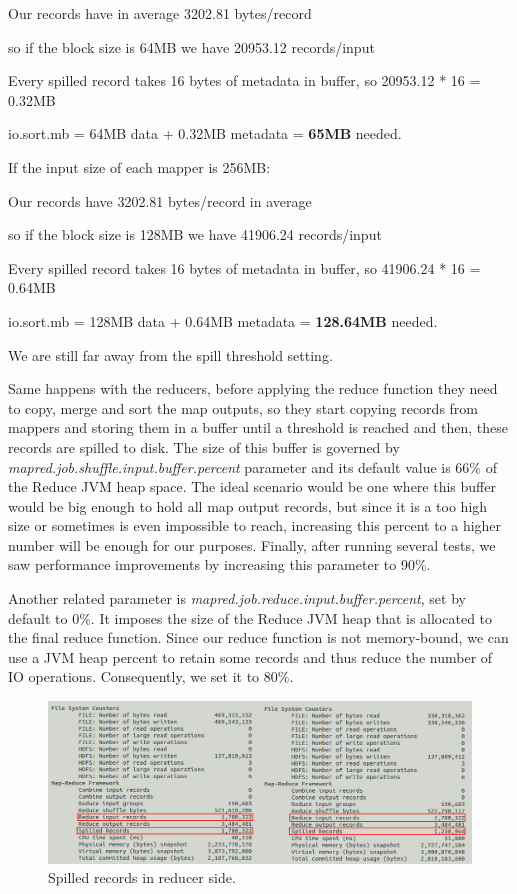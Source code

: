 \begin{itemize}
\centerline{Our records have in average 3202.81 bytes/record}
\centerline{so if the block size is 64MB we have 20953.12 records/input}
\centerline{Every spilled record takes 16 bytes of metadata in buffer, so 20953.12 * 16 = 0.32MB}
\centerline{io.sort.mb = 64MB data + 0.32MB metadata = \textbf{65MB} needed.}

\bigskip

If the input size of each mapper is 256MB:

\bigskip
\centerline{Our records have 3202.81 bytes/record in average}
\centerline{so if the block size is 128MB we have 41906.24 records/input}      
\centerline{Every spilled record takes 16 bytes of metadata in buffer, so 41906.24 * 16 = 0.64MB}
\centerline{io.sort.mb = 128MB data + 0.64MB metadata = \textbf{128.64MB} needed.}
\bigskip
\par
We are still far away from the spill threshold setting. 

\bigskip

Same happens with the reducers, before applying the reduce function they need to copy, merge and sort the map outputs, so they start copying records from mappers and storing them in a buffer until a threshold is reached and then, these records are spilled to disk. The size of this buffer is governed by \textit{mapred.job.shuffle.input.buffer.percent} parameter and its default value is 66\% of the Reduce JVM heap space. The ideal scenario would be one where this buffer would be big enough to hold all map output records, but since it is a too high size or sometimes is even impossible to reach, increasing this percent to a higher number will be enough for our purposes. Finally, after running several tests, we saw performance improvements by increasing this parameter to 90\%.
\par 
Another related parameter is \textit{mapred.job.reduce.input.buffer.percent}, set by default to 0\%. It imposes the size of the Reduce JVM heap that is allocated to the final reduce function. Since our reduce function is not memory-bound, we can use a JVM heap percent to retain some records and thus reduce the number of IO operations. Consequently, we set it to 80\%.


\begin{figure}[htb]
\centering
\includegraphics[width=1\textwidth]{./images/spilledReducerRecords.png}
\caption{Spilled records in reducer side.} \label{fig:spilledReducerRecords}
\end{figure}


\end{itemize}

